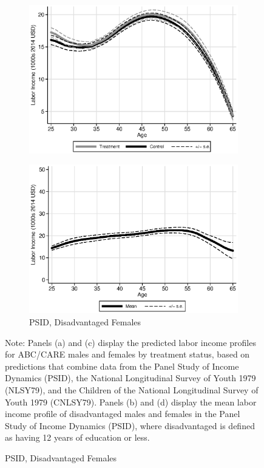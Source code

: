 \begin{figure}
\begin{subfigure}[h]{0.4\textwidth}
		\includegraphics[width=\textwidth]{output/labor_25-60_female_4.eps}
\end{subfigure}%
\begin{subfigure}[h]{0.4\textwidth}
	\centering
	\caption{PSID, Disadvantaged Females} \label{fig:psid0}
		\includegraphics[width=\textwidth]{output/psid_incomeprofiles_s0.eps}
\end{subfigure}
\footnotesize \justify
Note: Panels (a) and (c) display the predicted labor income profiles for ABC/CARE males and females by treatment status, based on predictions that combine data from the Panel Study of Income Dynamics (PSID), the National Longitudinal Survey of Youth 1979 (NLSY79), and the Children of the National Longitudinal Survey of Youth 1979 (CNLSY79). Panels (b) and (d) display the mean labor income profile of disadvantaged males and females in the Panel Study of Income Dynamics (PSID), where disadvantaged is defined as having 12 years of education or less.\\
\end{figure}


